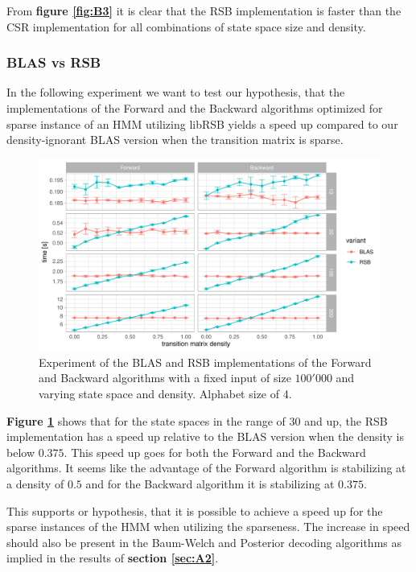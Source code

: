 From \textbf{figure \ref{fig:B3}} it is clear that the RSB implementation is faster than the CSR implementation for all combinations of state space size and density.

\subsubsection{BLAS vs RSB}\label{sec:B1}

In the following experiment we want to test our hypothesis, that the implementations of the Forward and the Backward algorithms optimized for sparse instance of an HMM utilizing libRSB yields a speed up compared to our density-ignorant BLAS version when the transition matrix is sparse.

\begin{figure}[H]
  \centering
  \includegraphics[scale=0.85]{figures/figure_B1.pdf}
  \caption{\small{Experiment of the BLAS and RSB implementations of the Forward and Backward algorithms with a fixed input of size $100'000$ and varying state space and density. Alphabet size of 4.}}
  \label{fig:B1}
\end{figure}

\textbf{Figure \ref{fig:B1}} shows that for the state spaces in the range of $30$ and up, the RSB implementation has a speed up relative to the BLAS version when the density is below $0.375$. This speed up goes for both the Forward and the Backward algorithms. It seems like the advantage of the Forward algorithm is stabilizing at a density of $0.5$ and for the Backward algorithm it is stabilizing at $0.375$.

This supports or hypothesis, that it is possible to achieve a speed up for the sparse instances of the HMM when utilizing the sparseness. 
The increase in speed should also be present in the Baum-Welch and Posterior decoding algorithms as implied in the results of \textbf{section \ref{sec:A2}}.

